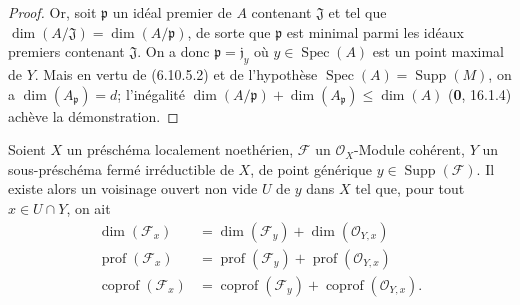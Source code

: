 \begin{proof}
Or, soit $\mathfrak p$ un idéal premier de $A$ contenant $\mathfrak J$ et
tel que $\dim(A/\mathfrak J)=\dim(A/\mathfrak p)$, de sorte que
$\mathfrak p$ est minimal parmi les idéaux premiers contenant
$\mathfrak J$. On a donc $\mathfrak p=\mathfrak j_y$ où
$y\in\operatorname{Spec}(A)$ est un point maximal de $Y$. Mais en vertu de
(6.10.5.2) et de l'hypothèse
$\operatorname{Spec}(A)=\operatorname{Supp}(M)$, on a
$\dim(A_{\mathfrak p})=d$; l'inégalité
$\dim(A/\mathfrak p)+\dim(A_{\mathfrak p})\leq\dim(A)$ (\textbf{0}, 16.1.4)
achève la démonstration.
\end{proof}

\begin{proposition}[6.10.6]
\label{IV.2.s6.10.6-fr}
Soient $X$ un préschéma localement noethérien, $\mathcal F$ un
$\mathcal O_X$-Module cohérent, $Y$ un sous-préschéma fermé irréductible de
$X$, de point générique $y\in\operatorname{Supp}(\mathcal F)$. Il existe
alors un voisinage ouvert non vide $U$ de $y$ dans $X$ tel que, pour tout
$x\in U\cap Y$, on ait
\begin{align}
\dim(\mathcal F_x)&=\dim(\mathcal F_y)+\dim(\mathcal O_{Y,x})
\tag{6.10.6.1}\label{IV.2.s6.10.6.1-fr}\\
\operatorname{prof}(\mathcal F_x)&=\operatorname{prof}(\mathcal F_y)+
\operatorname{prof}(\mathcal O_{Y,x})
\tag{6.10.6.2}\label{IV.2.s6.10.6.2-fr}\\
\operatorname{coprof}(\mathcal F_x)&=\operatorname{coprof}(\mathcal F_y)+
\operatorname{coprof}(\mathcal O_{Y,x}).
\tag{6.10.6.3}\label{IV.2.s6.10.6.3-fr}
\end{align}
\end{proposition}

